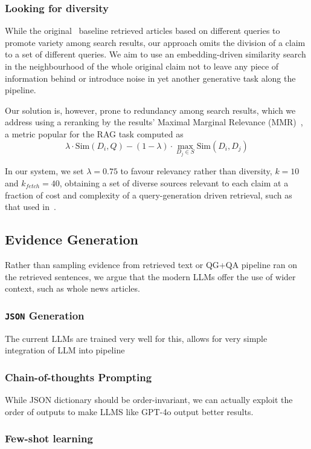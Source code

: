 \subsubsection{Looking for diversity}
While the original~\cite{averitec2024} baseline retrieved articles based on different queries to promote variety among search results, our approach omits the division of a claim to a set of different queries.
We aim to use an embedding-driven similarity search in the neighbourhood of the whole original claim not to leave any piece of information behind or introduce noise in yet another generative task along the pipeline.

Our solution is, however, prone to redundancy among search results, which we address using a reranking by the results' Maximal Marginal Relevance (MMR)~\cite{carbonell-mmr}, a metric popular for the RAG task computed as
$$\lambda \cdot \mathrm{Sim}(D_i, Q) - (1-\lambda) \cdot \max_{D_j \in S} \mathrm{Sim}(D_i, D_j)$$

In our system, we set $\lambda=0.75$ to favour relevancy rather than diversity, $k=10$ and $k_{fetch} = 40$, obtaining a set of diverse sources relevant to each claim at a fraction of cost and complexity of a query-generation driven retrieval, such as that used in~\cite{averitec2024}.

\subsection{Evidence Generation}
Rather than sampling evidence from retrieved text or QG+QA pipeline ran on the retrieved sentences, we argue that the modern LLMs offer the use of wider context, such as whole news articles.

\subsubsection{\texttt{JSON} Generation}
The current LLMs are trained very well for this, allows for very simple integration of LLM into pipeline

\subsubsection{Chain-of-thoughts Prompting}
While JSON dictionary should be order-invariant, we can actually exploit the order of outputs to make LLMS like GPT-4o output better results.

\subsubsection{Few-shot learning}



